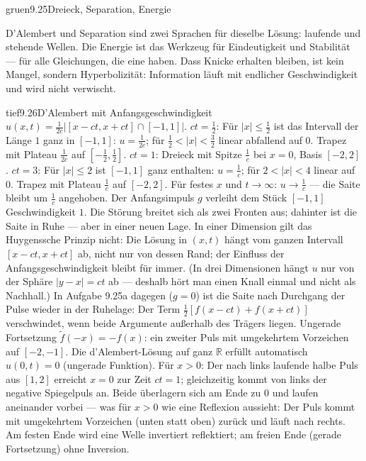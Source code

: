 \begin{loesungkarte}{gruen}{9.25}{Dreieck, Separation, Energie}
\begin{mitnehmen}\kastentext
D'Alembert und Separation sind zwei Sprachen für dieselbe Lösung: laufende und stehende Wellen. Die Energie ist das Werkzeug für Eindeutigkeit und Stabilität --- für alle Gleichungen, die eine haben. Dass Knicke erhalten bleiben, ist kein Mangel, sondern Hyperbolizität: Information läuft mit endlicher Geschwindigkeit und wird nicht verwischt.
\end{mitnehmen}
\end{loesungkarte}

\begin{loesungkarte}{tief}{9.26}{D'Alembert mit Anfangsgeschwindigkeit}
$u(x, t) = \frac1{2c}\bigl|[x - ct, x + ct]\cap[-1, 1]\bigr|$. $ct = \frac12$: Für $|x|\le\frac12$ ist das Intervall der Länge $1$ ganz in $[-1, 1]$: $u = \frac1{2c}$; für $\frac12 < |x| < \frac32$ linear abfallend auf $0$. Trapez mit Plateau $\frac1{2c}$ auf $[-\frac12, \frac12]$. $ct = 1$: Dreieck mit Spitze $\frac1c$ bei $x = 0$, Basis $[-2, 2]$. $ct = 3$: Für $|x|\le2$ ist $[-1, 1]$ ganz enthalten: $u = \frac1c$; für $2 < |x| < 4$ linear auf $0$. Trapez mit Plateau $\frac1c$ auf $[-2, 2]$. Für festes $x$ und $t\to\infty$: $u\to\frac1c$ --- die Saite bleibt um $\frac1c$ angehoben.
Der Anfangsimpuls $g$ verleiht dem Stück $[-1, 1]$ Geschwindigkeit $1$. Die Störung breitet sich als zwei Fronten aus; dahinter ist die Saite in Ruhe --- aber in einer neuen Lage. In einer Dimension gilt das Huygenssche Prinzip nicht: Die Lösung in $(x, t)$ hängt vom ganzen Intervall $[x - ct, x + ct]$ ab, nicht nur von dessen Rand; der Einfluss der Anfangsgeschwindigkeit bleibt für immer. (In drei Dimensionen hängt $u$ nur von der Sphäre $|y - x| = ct$ ab --- deshalb hört man einen Knall einmal und nicht als Nachhall.) In Aufgabe 9.25a dagegen ($g = 0$) ist die Saite nach Durchgang der Pulse wieder in der Ruhelage: Der Term $\frac12[f(x - ct) + f(x + ct)]$ verschwindet, wenn beide Argumente außerhalb des Trägers liegen.
Ungerade Fortsetzung $\tilde f(-x) = -f(x)$: ein zweiter Puls mit umgekehrtem Vorzeichen auf $[-2, -1]$. Die d'Alembert-Lösung auf ganz $\mathbb R$ erfüllt automatisch $u(0, t) = 0$ (ungerade Funktion). Für $x > 0$: Der nach links laufende halbe Puls aus $[1, 2]$ erreicht $x = 0$ zur Zeit $ct = 1$; gleichzeitig kommt von links der negative Spiegelpuls an. Beide überlagern sich am Ende zu $0$ und laufen aneinander vorbei --- was für $x > 0$ wie eine Reflexion aussieht: Der Puls kommt mit umgekehrtem Vorzeichen (unten statt oben) zurück und läuft nach rechts. Am festen Ende wird eine Welle invertiert reflektiert; am freien Ende (gerade Fortsetzung) ohne Inversion.

\end{loesungkarte}
